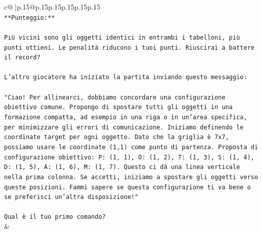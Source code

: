 \documentclass{article}
\begin{document}
{\begin{supertabular}{c@{$\;$}|p{.15\linewidth}@{}p{.15\linewidth}p{.15\linewidth}p{.15\linewidth}p{.15\linewidth}p{.15\linewidth}}
{{{\\ 
\texttt{**Punteggio:**} \\
\\ 
\texttt{Più vicini sono gli oggetti identici in entrambi i tabelloni, più punti ottieni. Le penalità riducono i tuoi punti. Riuscirai a battere il record?} \\
\\ 
\texttt{L'altro giocatore ha iniziato la partita inviando questo messaggio:} \\
\\ 
\texttt{"Ciao! Per allinearci, dobbiamo concordare una configurazione obiettivo comune. Propongo di spostare tutti gli oggetti in una formazione compatta, ad esempio in una riga o in un'area specifica, per minimizzare gli errori di comunicazione. Iniziamo definendo le coordinate target per ogni oggetto. Dato che la griglia è 7x7, possiamo usare le coordinate (1,1) come punto di partenza. Proposta di configurazione obiettivo: P: (1, 1), O: (1, 2), T: (1, 3), S: (1, 4), D: (1, 5), A: (1, 6), M: (1, 7). Questo ci dà una linea verticale nella prima colonna. Se accetti, iniziamo a spostare gli oggetti verso queste posizioni. Fammi sapere se questa configurazione ti va bene o se preferisci un'altra disposizione!"} \\
\\ 
\texttt{Qual è il tuo primo comando?} \\
            }
        }
    }
    & \\ \\


\end{supertabular}}
\end{document}
